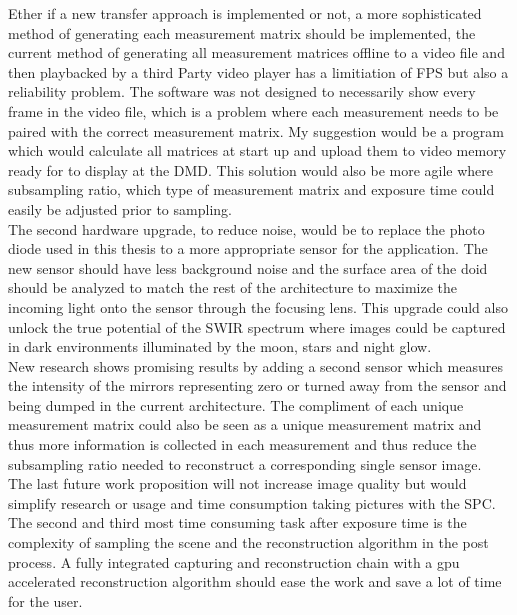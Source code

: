 Ether if a new transfer approach is implemented or not, a more sophisticated method of generating each measurement matrix should be implemented, the current method of generating all  measurement matrices offline to a video file and then playbacked by a third Party video player has a limitiation of FPS but also a reliability problem. The software was not designed to necessarily show every frame in the video file, which is a problem where each measurement needs to be paired with the correct measurement matrix. My suggestion would be a program which would calculate all matrices at start up and upload them to video memory ready for to display at the DMD. This solution would also be more agile where subsampling ratio, which type of measurement matrix and exposure time could easily be adjusted prior to sampling.\\[0.1in]

The second hardware upgrade, to reduce noise, would be to replace the photo diode used in this thesis to a more appropriate sensor for the application. The new sensor should have less background noise and the surface area of the doid should be analyzed to match the rest of the architecture to maximize the incoming light onto the sensor through the focusing lens. This upgrade could also unlock the true potential of the SWIR spectrum where images could be captured in dark environments illuminated by the moon, stars and night glow.\\[0.1in]

New research shows promising results by adding a second sensor which measures the intensity of the mirrors representing zero or turned away from the sensor and being dumped in the current architecture. The compliment of each unique measurement matrix could also be seen as a unique measurement matrix and thus more information is collected in each measurement and thus reduce the subsampling ratio needed to reconstruct a corresponding single sensor image.\cite{article:nature_dual_sensor}\\[0.1in]

The last future work proposition will not increase image quality but would simplify research or usage and time consumption taking pictures with the SPC. The second and third most time consuming task after exposure time is the complexity of sampling the scene and the reconstruction algorithm in the post process. A fully integrated capturing and reconstruction chain with a gpu accelerated reconstruction algorithm should ease the work and save a lot of time for the user. 
 
